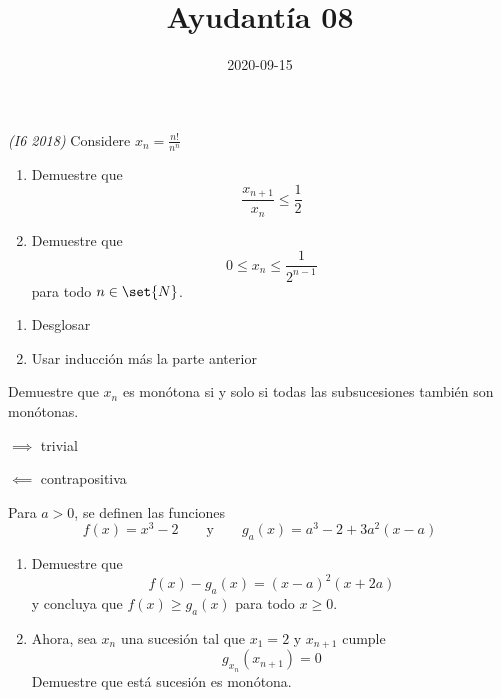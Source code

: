 \documentclass{ayudantia}
\title{Ayudantía 08}
\date{2020-09-15}
\begin{document}
\maketitle

\begin{prob}\textit{(I6 2018)}
    Considere \(x_n=\frac{n!}{n^n}\)
    \begin{enumerate}[label=(\alph*)]
        \item Demuestre que
        \begin{equation*}
            \frac{x_{n+1}}{x_n}\leq\frac12
        \end{equation*}
        \item Demuestre que
        \begin{equation*}
            0\leq x_n\leq\frac1{2^{n-1}}
        \end{equation*}
        para todo \(n\in\set{N}\).
    \end{enumerate}
\end{prob}

\begin{ans}
    \begin{sol}
        \begin{enumerate}[label=(\alph*)]
            \item Desglosar
            \item Usar inducción más la parte anterior
        \end{enumerate}
    \end{sol}
\end{ans}


\begin{prob}
    Demuestre que \(x_n\) es monótona si y solo si todas las subsucesiones también son monótonas.
\end{prob}

\begin{ans}
    \begin{sol}
        \(\implies\) trivial
        
        \(\impliedby\) contrapositiva
    \end{sol}
\end{ans}


\begin{prob}
    Para \(a>0\), se definen las funciones
    \begin{equation*}
        f(x)=x^3-2\qquad\text{y}\qquad g_a(x)=a^3-2+3a^2(x-a)
    \end{equation*}
    \begin{enumerate}[label=(\alph*)]
        \item Demuestre que
        \begin{equation*}
            f(x)-g_a(x)=(x-a)^2(x+2a)
        \end{equation*}
        y concluya que \(f(x)\geq g_a(x)\) para todo \(x\geq 0\).
        \item Ahora, sea \(x_n\) una sucesión tal que \(x_1=2\) y \(x_{n+1}\) cumple
        \begin{equation*}
            g_{x_n}(x_{n+1})=0
        \end{equation*}
        Demuestre que está sucesión es monótona.
    \end{enumerate}
\end{prob}
\end{document}
